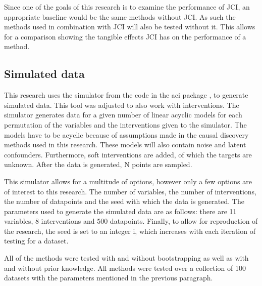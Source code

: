 \documentclass[a4paper,pdf]{article}
\begin{document}
Since one of the goals of this research is to examine the performance of JCI, an appropriate baseline would be the same methods without JCI. As such the methods used in combination with JCI will also be tested without it. This allows for a comparison showing the tangible effects JCI has on the performance of a method.

\subsection{Simulated data}
This research uses the simulator from the code in the aci package \cite{jci}, to generate simulated data. This tool was adjusted to also work with interventions. The simulator generates data for a given number of linear acyclic models for each permutation of the variables and the interventions given to the simulator. The models have to be acyclic because of assumptions made in the causal discovery methods used in this research. These models will also contain noise and latent confounders. Furthermore, soft interventions are added, of which the targets are unknown. After the data is generated, N points are sampled.

This simulator allows for a multitude of options, however only a few options are of interest to this research. The number of variables, the number of interventions, the number of datapoints and the seed with which the data is generated. The parameters used to generate the simulated data are as follows: there are 11 variables, 8 interventions and 500 datapoints. Finally, to allow for reproduction of the research, the seed is set to an integer i, which increases with each iteration of testing for a dataset.


All of the methods were tested with and without bootstrapping as well as with and without prior knowledge. All methods were tested over a collection of 100 datasets with the parameters mentioned in the previous paragraph.
\end{document}

